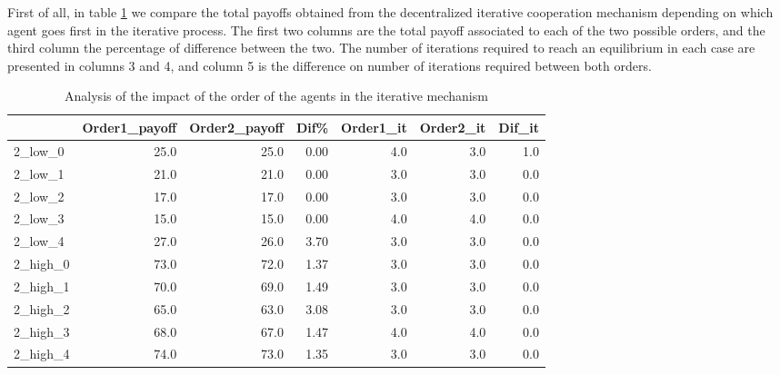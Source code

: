 \documentclass[review]{elsarticle}
\begin{document}
First of all, in table \ref{tb:iter_order_comparition} we compare the total payoffs obtained from the decentralized iterative cooperation mechanism depending on which agent goes first in the iterative process. The first two columns are the total payoff associated to each of the two possible orders, and the third column the percentage of difference between the two. The number of iterations required to reach an equilibrium in each case are presented in columns 3 and 4, and column 5 is the difference on number of iterations required between both orders.



\begin{table}[ht!]
\centering
\caption{Analysis of the impact of the order of the agents in the iterative mechanism \label{tb:iter_order_comparition}}
\begin{adjustbox}{max width=\textwidth}
\begin{tabular}{lrrrrrr}
\toprule
{} &  Order1\_payoff &  Order2\_payoff &      Dif\% &  Order1\_it &  Order2\_it &  Dif\_it \\
\midrule
2\_low\_0  &           25.0 &           25.0 &  0.00 &        4.0 &        3.0 &     1.0 \\
2\_low\_1  &           21.0 &           21.0 &  0.00 &        3.0 &        3.0 &     0.0 \\
2\_low\_2  &           17.0 &           17.0 &  0.00 &        3.0 &        3.0 &     0.0 \\
2\_low\_3  &           15.0 &           15.0 &  0.00 &        4.0 &        4.0 &     0.0 \\
2\_low\_4  &           27.0 &           26.0 &  3.70 &        3.0 &        3.0 &     0.0 \\
2\_high\_0 &           73.0 &           72.0 &  1.37 &        3.0 &        3.0 &     0.0 \\
2\_high\_1 &           70.0 &           69.0 &  1.49 &        3.0 &        3.0 &     0.0 \\
2\_high\_2 &           65.0 &           63.0 &  3.08 &        3.0 &        3.0 &     0.0 \\
2\_high\_3 &           68.0 &           67.0 &  1.47 &        4.0 &        4.0 &     0.0 \\
2\_high\_4 &           74.0 &           73.0 &  1.35 &        3.0 &        3.0 &     0.0 \\
\bottomrule
\end{tabular}
\end{adjustbox}
\end{table}
\end{document}
